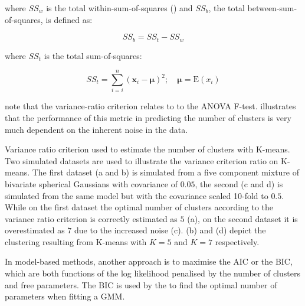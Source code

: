 where $SS_{w}$ is the total within-sum-of-squares () and $SS_{b}$, the total between-sum-of-squares, is defined as:

\[
   SS_{b} = SS_{t} - SS_{w}
\]

where $SS_{t}$ is the total sum-of-squares:

\[
  SS_{t} = \sum_{i=i}^{n} ( \mathbf x_i - \boldsymbol\mu )^2 ; \quad \boldsymbol\mu=\text{E}(x_i)
\]

\citeauthor{Calinski:1974bt}  note that the variance-ratio criterion relates to
to the \gls{ANOVA} F-test.
 illustrates that the performance of this metric in predicting the number of clusters
is very much dependent on the inherent noise in the data.



{Variance ratio criterion used to estimate the number of clusters with K-means.}
{
  Two simulated datasets are used to illustrate the variance criterion ratio on K-means.
  The first dataset (a and b) is simulated from a five component mixture of bivariate spherical Gaussians with covariance of $0.05$,
  the second (c and d) is simulated from the same model but with the covariance scaled 10-fold to $0.5$.
  While on the first dataset the optimal number of clusters according to the variance ratio criterion is correctly estimated as $5$ (a),
  on the second dataset it is overestimated as $7$ due to the increased noise (c).
  (b) and (d) depict the clustering resulting from K-means with $K=5$ and $K=7$ respectively.
}


In model-based methods, another approach is to maximise the \gls{AIC} or the \gls{BIC},
which are both functions of the log likelihood penalised by the number of clusters and free parameters.
The \gls{BIC} is used by the  to find the optimal number of parameters when fitting a \gls{GMM}.


